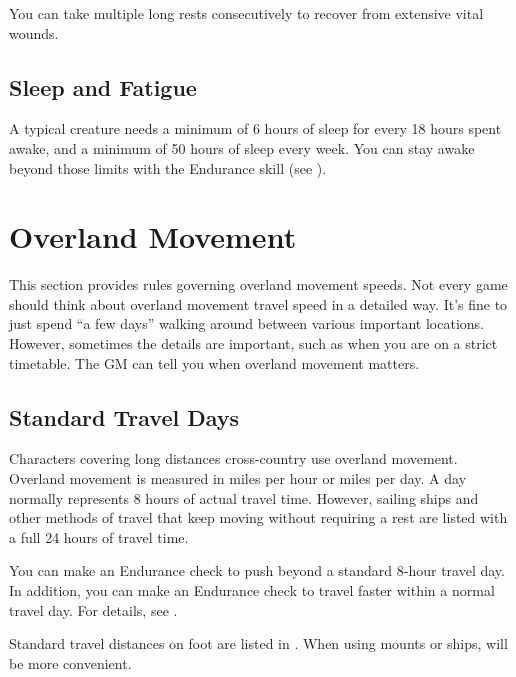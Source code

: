     You can take multiple long rests consecutively to recover from extensive vital wounds.

  \subsection{Sleep and Fatigue}\label{Sleep and Fatigue}
    A typical creature needs a minimum of 6 hours of sleep for every 18 hours spent awake, and a minimum of 50 hours of sleep every week.
    You can stay awake beyond those limits with the Endurance skill (see ).

\section{Overland Movement}\label{Overland Movement}
  This section provides rules governing overland movement speeds.
  Not every game should think about overland movement travel speed in a detailed way.
  It's fine to just spend ``a few days'' walking around between various important locations.
  However, sometimes the details are important, such as when you are on a strict timetable.
  The GM can tell you when overland movement matters.

  \subsection{Standard Travel Days}
    Characters covering long distances cross-country use overland movement.
    Overland movement is measured in miles per hour or miles per day.
    A day normally represents 8 hours of actual travel time.
    However, sailing ships and other methods of travel that keep moving without requiring a rest are listed with a full 24 hours of travel time.

    You can make an Endurance check to push beyond a standard 8-hour travel day.
    In addition, you can make an Endurance check to travel faster within a normal travel day.
    For details, see .

    Standard travel distances on foot are listed in .
    When using mounts or ships,  will be more convenient.

